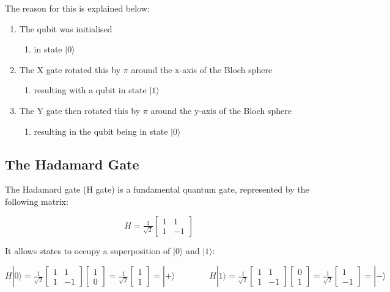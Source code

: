 The reason for this is explained below:
\begin{enumerate}
    \item The qubit was initialised 
    \begin{enumerate}
        \item in state $|0\rangle$
    \end{enumerate}
    \item The X gate rotated this by $\pi$ around the x-axis of the Bloch sphere
    \begin{enumerate}
        \item resulting with a qubit in state $|1\rangle$
    \end{enumerate}
    \item The Y gate then rotated this by $\pi$ around the y-axis of the Bloch sphere
    \begin{enumerate}
        \item resulting in the qubit being in state $|0\rangle$
    \end{enumerate} 
\end{enumerate}

\subsection{The Hadamard Gate}\label{sec:HZH}
The Hadamard gate (H gate) is a fundamental quantum gate, represented by the following matrix:

$$ H = \tfrac{1}{\sqrt{2}}\begin{bmatrix} 1 & 1 \\ 1 & -1 \end{bmatrix} $$

It allows states to occupy a superposition of $|0\rangle$ and $|1\rangle$:

$$ H|0\rangle = \tfrac{1}{\sqrt{2}}\begin{bmatrix} 1 & 1 \\ 1 & -1 \end{bmatrix}\begin{bmatrix} 1 \\ 0 \end{bmatrix} = \tfrac{1}{\sqrt{2}} \begin{bmatrix} 1 \\ 1 \end{bmatrix}= |+\rangle 
\quad \quad \quad \quad 
H|1\rangle = \tfrac{1}{\sqrt{2}}\begin{bmatrix} 1 & 1 \\ 1 & -1 \end{bmatrix}\begin{bmatrix} 0 \\ 1 \end{bmatrix} = \tfrac{1}{\sqrt{2}} \begin{bmatrix} 1 \\ -1 \end{bmatrix}= |-\rangle $$

